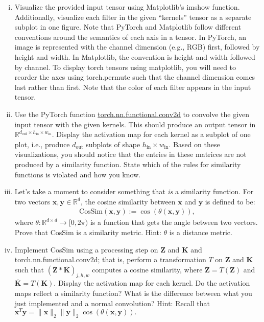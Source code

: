 \documentclass{exam}
\begin{document}
\begin{enumerate}[i.]
    \item Visualize the provided input tensor using Matplotlib's imshow function. Additionally, visualize each filter in the given ``kernels'' tensor as a separate subplot in one figure. Note that PyTorch and Matplotlib follow different conventions around the semantics of each axis in a tensor. In PyTorch, an image is represented with the channel dimension (e.g., RGB) first, followed by height and width. In Matplotlib, the convention is height and width followed by channel. To display torch tensors using matplotlib, you will need to reorder the axes using torch.permute such that the channel dimension comes last rather than first. Note that the color of each filter appears in the input tensor.
    \item Use the PyTorch function \href{https://pytorch.org/docs/stable/generated/torch.nn.functional.conv2d.html}{torch.nn.functional.conv2d} to convolve the given input tensor with the given kernels. This should produce an output tensor in $\mathbb{R}^{d_{\text{out}} \times h_{\text{in}} \times w_{\text{in}}}.$ Display the activation map for each kernel as a subplot of one plot, i.e., produce $d_{\text{out}}$ subplots of shape $h_{\text{in}} \times w_{\text{in}}.$ Based on these visualizations, you should notice that the entries in these matrices are not produced by a similarity function. State which  of the rules for similarity functions is violated and how you know.
    \item Let's take a moment to consider something that \textit{is} a similarity function. For two vectors $\mathbf{x}, \mathbf{y} \in \mathbb{R}^d$, the cosine similarity between $\mathbf{x}$ and $\mathbf{y}$ is defined to be:
    \begin{align}
        \text{CosSim}(\mathbf{x}, \mathbf{y}) := \cos(\theta(\mathbf{x}, \mathbf{y})),
    \end{align}
    where $\theta: \mathbb{R}^{d \times d} \to [0, 2\pi)$ is a function that gets the angle between two vectors. Prove that CosSim is a similarity metric. Hint: $\theta$ is a distance metric.
    
    \item Implement CosSim using a processing step on $\mathbf{Z}$ and $\mathbf{K}$ and torch.nn.functional.conv2d; that is, perform a transformation $T$ on $\mathbf{Z}$ and $\mathbf{K}$ such that $(\bar{\mathbf{Z}} * \bar{\mathbf{K}})_{j, h, w}$ computes a cosine similarity, where $\bar{\mathbf{Z}} = T(\mathbf{Z})$ and $\bar{\mathbf{K}} = T(\mathbf{K})$. Display the activation map for each kernel. Do the activation maps reflect a similarity function? What is the difference between what you just implemented and a normal convolution? Hint: Recall that $\mathbf{x}^T \mathbf{y} = \|\mathbf{x}\|_2 \|\mathbf{y}\|_2 \cos(\theta(\mathbf{x}, \mathbf{y})).$
\end{enumerate}
\end{document}
